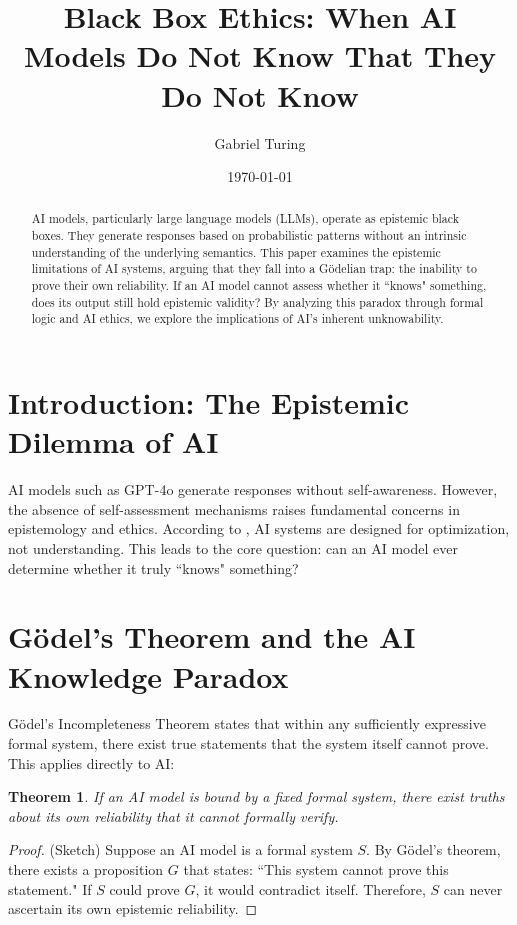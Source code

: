 \documentclass{article}
\title{Black Box Ethics: When AI Models Do Not Know That They Do Not Know}
\author{Gabriel Turing}
\date{\today}
\newtheorem{theorem}{Theorem}
\begin{document}
  
	
	\maketitle  
	
	\begin{abstract}  
		AI models, particularly large language models (LLMs), operate as epistemic black boxes. They generate responses based on probabilistic patterns without an intrinsic understanding of the underlying semantics. This paper examines the epistemic limitations of AI systems, arguing that they fall into a Gödelian trap: the inability to prove their own reliability. If an AI model cannot assess whether it ``knows" something, does its output still hold epistemic validity? By analyzing this paradox through formal logic and AI ethics, we explore the implications of AI's inherent unknowability.  
	\end{abstract}  
	
	\section{Introduction: The Epistemic Dilemma of AI}  
	AI models such as GPT-4o generate responses without self-awareness. However, the absence of self-assessment mechanisms raises fundamental concerns in epistemology and ethics. According to \cite{russell2021human}, AI systems are designed for optimization, not understanding. This leads to the core question: can an AI model ever determine whether it truly ``knows" something?  
	
	\section{Gödel's Theorem and the AI Knowledge Paradox}  
	Gödel's Incompleteness Theorem states that within any sufficiently expressive formal system, there exist true statements that the system itself cannot prove. This applies directly to AI:  
	
	\begin{theorem}  
		If an AI model is bound by a fixed formal system, there exist truths about its own reliability that it cannot formally verify.  
	\end{theorem}  
	
	\begin{proof}  
		(Sketch) Suppose an AI model is a formal system \( S \). By Gödel's theorem, there exists a proposition \( G \) that states: ``This system cannot prove this statement." If \( S \) could prove \( G \), it would contradict itself. Therefore, \( S \) can never ascertain its own epistemic reliability.  
	\end{proof}  
	
\end{document}
